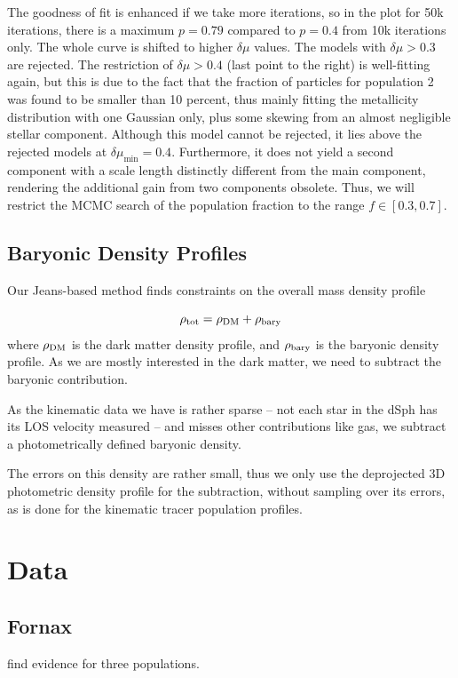 The goodness of fit is enhanced if we take more iterations, so in the
plot for 50k iterations, there is a maximum $p=0.79$ compared to
$p=0.4$ from 10k iterations only. The whole curve is shifted to higher
$\delta \mu$ values. The models with $\delta \mu>0.3$ are
rejected. The restriction of $\delta \mu>0.4$ (last point to the
right) is well-fitting again, but this is due to the fact that the
fraction of particles for population 2 was found to be smaller than 10
percent, thus mainly fitting the metallicity distribution with one
Gaussian only, plus some skewing from an almost negligible stellar
component. Although this model cannot be rejected, it lies above the
rejected models at $\delta\mu_{\min}=0.4$. Furthermore, it does not
yield a second component with a scale length distinctly different from
the main component, rendering the additional gain from two components
obsolete. Thus, we will restrict the MCMC search of the population
fraction to the range $f\in[0.3,0.7]$.

\subsection{Baryonic Density Profiles}
Our Jeans-based method finds constraints on the overall mass density
profile

\begin{equation}
  \rho_{\rm tot} = \rho_{\rm DM}+\rho_{\rm bary}
\end{equation}
where $\rho_{\rm DM}$ is the dark matter density profile, and
$\rho_{\rm bary}$ is the baryonic density profile. As we are mostly
interested in the dark matter, we need to subtract the baryonic
contribution.

As the kinematic data we have is rather sparse -- not each star in the
dSph has its LOS velocity measured -- and misses other contributions
like gas, we subtract a photometrically defined baryonic density.

The errors on this density are rather small, thus we only use the
deprojected 3D photometric density profile for the subtraction,
without sampling over its errors, as is done for the kinematic tracer
population profiles.

\section{Data}

\subsection{Fornax}  find evidence for three populations.

